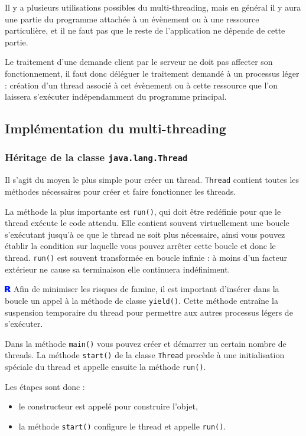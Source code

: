 \documentclass[a4paper,11pt]{report}
\newcommand{\remarque}[1]{
	\begin{center}
	\medskip
	\colorbox{remarque}{
		\begin{minipage}{0.8\textwidth}\medskip\includegraphics[height=10px]{images/remarque.png} #1 \medskip\end{minipage}
	}
	\medskip
	\end{center}
}
\newcommand{\exemple}[1]{
	\begin{center}
	\medskip
	\colorbox{exemple}{
		\begin{minipage}{0.8\textwidth}\medskip#1 \medskip\end{minipage}
	}
	\medskip
	\end{center}
}
\begin{document}
Il y a plusieurs utilisations possibles du multi-threading, mais en général il y aura une partie du programme attachée à un évènement ou à une ressource particulière, et il ne faut pas que le reste de l\rq{}application ne dépende de cette partie.

\exemple{Le traitement d\rq{}une demande client par le serveur ne doit pas affecter son fonctionnement, il faut donc déléguer le traitement demandé à un processus léger : création d\rq{}un thread associé à cet évènement ou à cette ressource que l\rq{}on laissera s\rq{}exécuter indépendamment du programme principal.}

\subsection{Implémentation du multi-threading}
\subsubsection{Héritage de la classe \texttt{java.lang.Thread}}

Il s\rq{}agit du moyen le plus simple pour créer un thread. \texttt{Thread} contient toutes les méthodes nécessaires pour créer et faire fonctionner les threads.

La méthode la plus importante est \texttt{run()}, qui doit être redéfinie pour que le thread exécute le code attendu. Elle contient souvent virtuellement une boucle s\rq{}exécutant jusqu\rq{}à ce que le thread ne soit plus nécessaire, ainsi vous pouvez établir la condition sur laquelle vous pouvez arrêter cette boucle et donc le thread. \texttt{run()} est souvent transformée en boucle infinie : à moins d\rq{}un facteur extérieur ne cause sa terminaison elle continuera indéfiniment.

\remarque{Afin de minimiser les risques de famine, il est important d\rq{}insérer dans la boucle un appel à la méthode de classe \texttt{yield()}. Cette méthode entraîne la suspension temporaire du thread pour permettre aux autres processus légers de s\rq{}exécuter.}

Dans la méthode \texttt{main()} vous pouvez créer et démarrer un certain nombre de threads. La méthode \texttt{start()} de la classe \texttt{Thread} procède à une initialisation spéciale du thread et appelle ensuite la méthode \texttt{run()}.

Les étapes sont donc :
\begin{itemize}
\item le constructeur est appelé pour construire l\rq{}objet,
\item la méthode \texttt{start()} configure le thread et appelle \texttt{run()}.
\end{itemize}
\end{document}
